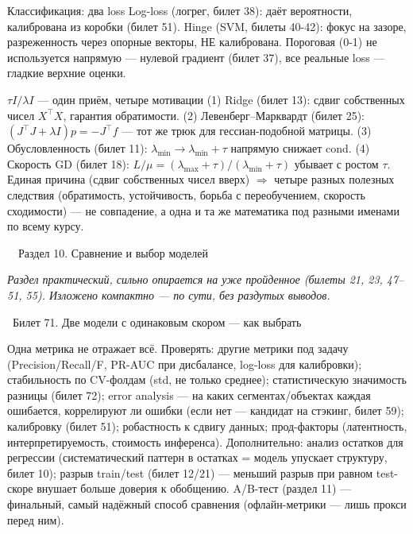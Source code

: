 \documentclass[12pt, a4paper]{article}
\newcommand{\razdel}[2]{%
  \clearpage%
  \noindent\colorbox{razdelcol}{\parbox{\dimexpr\linewidth-2\fboxsep\relax}{%
    \color{white}\LARGE\bfseries\strut\ \ Раздел #1. #2%
  }}%
  \vspace{10pt}%
}
\newcommand{\bilet}[2]{%
  \vspace{10pt}%
  \noindent\colorbox{qcolor}{\parbox{\dimexpr\linewidth-2\fboxsep\relax}{%
    \color{white}\large\bfseries\strut\ Билет #1. #2%
  }}%
  \nopagebreak\vspace{5pt}\par\nopagebreak%
}
\begin{document}
\begin{defbox}{Классификация: два loss}
Log-loss (логрег, билет 38): даёт вероятности, калибрована из коробки (билет 51). Hinge (SVM, билеты 40-42): фокус на зазоре, разреженность через опорные векторы, НЕ калибрована. Пороговая (0-1) не используется напрямую --- нулевой градиент (билет 37), все реальные loss --- гладкие верхние оценки.
\end{defbox}

\begin{thmbox}{$\tau I/\lambda I$ --- один приём, четыре мотивации}
(1) Ridge (билет 13): сдвиг собственных чисел $X^\top X$, гарантия обратимости. (2) Левенберг--Марквардт (билет 25): $(J^\top J+\lambda I)p=-J^\top f$ --- тот же трюк для гессиан-подобной матрицы. (3) Обусловленность (билет 11): $\lambda_{\min}\to\lambda_{\min}+\tau$ напрямую снижает $\text{cond}$. (4) Скорость GD (билет 18): $L/\mu=(\lambda_{\max}+\tau)/(\lambda_{\min}+\tau)$ убывает с ростом $\tau$.
Единая причина (сдвиг собственных чисел вверх) $\Rightarrow$ четыре разных полезных следствия (обратимость, устойчивость, борьба с переобучением, скорость сходимости) --- не совпадение, а одна и та же математика под разными именами по всему курсу.
\end{thmbox}

\vspace{1cm}
\razdel{10}{Сравнение и выбор моделей}

\textit{Раздел практический, сильно опирается на уже пройденное (билеты 21, 23, 47--51, 55). Изложено компактно --- по сути, без раздутых выводов.}

\bilet{71}{Две модели с одинаковым скором --- как выбрать}
Одна метрика не отражает всё. Проверять: другие метрики под задачу (Precision/Recall/F, PR-AUC при дисбалансе, log-loss для калибровки); стабильность по CV-фолдам (std, не только среднее); статистическую значимость разницы (билет 72); error analysis --- на каких сегментах/объектах каждая ошибается, коррелируют ли ошибки (если нет --- кандидат на стэкинг, билет 59); калибровку (билет 51); робастность к сдвигу данных; прод-факторы (латентность, интерпретируемость, стоимость инференса). Дополнительно: анализ остатков для регрессии (систематический паттерн в остатках = модель упускает структуру, билет 10); разрыв train/test (билет 12/21) --- меньший разрыв при равном test-скоре внушает больше доверия к обобщению. A/B-тест (раздел 11) --- финальный, самый надёжный способ сравнения (офлайн-метрики --- лишь прокси перед ним).
\end{document}
